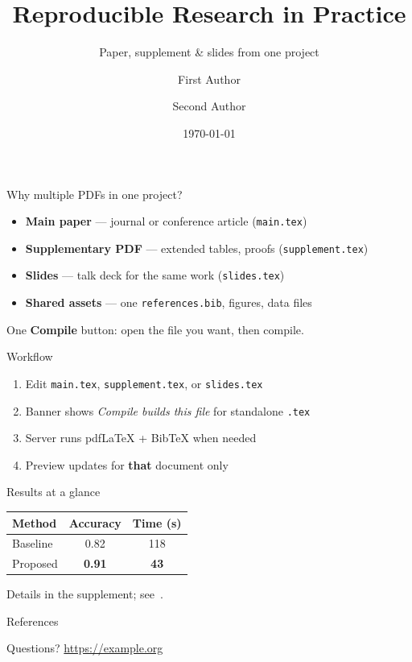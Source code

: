 \documentclass[11pt,aspectratio=169]{beamer}
\title[Multi-file \LaTeX]{Reproducible Research in Practice}
\subtitle{Paper, supplement \& slides from one project}
\author{First Author \and Second Author}
\institute{University of Example}
\date{\today}
\begin{document}
\begin{frame}
  \titlepage
\end{frame}

\begin{frame}{Why multiple PDFs in one project?}
  \begin{itemize}
    \item \textbf{Main paper} — journal or conference article (\texttt{main.tex})
    \item \textbf{Supplementary PDF} — extended tables, proofs (\texttt{supplement.tex})
    \item \textbf{Slides} — talk deck for the same work (\texttt{slides.tex})
    \item \textbf{Shared assets} — one \texttt{references.bib}, figures, data files
  \end{itemize}
  \vfill
  \small One \textbf{Compile} button: open the file you want, then compile.
\end{frame}

\begin{frame}{Workflow}
  \begin{enumerate}
    \item Edit \texttt{main.tex}, \texttt{supplement.tex}, or \texttt{slides.tex}
    \item Banner shows \emph{Compile builds this file} for standalone \texttt{.tex}
    \item Server runs pdfLaTeX + BibTeX when needed
    \item Preview updates for \textbf{that} document only
  \end{enumerate}
\end{frame}

\begin{frame}{Results at a glance}
  \begin{table}
    \centering
    \begin{tabular}{lcc}
      \toprule
      Method & Accuracy & Time (s) \\
      \midrule
      Baseline & 0.82 & 118 \\
      Proposed & \textbf{0.91} & \textbf{43} \\
      \bottomrule
    \end{tabular}
  \end{table}
  \vfill
  \footnotesize Details in the supplement; see~\cite{example2024methods}.
\end{frame}

\begin{frame}{References}
  \footnotesize
  
  
\end{frame}

\begin{frame}
  \centering
  \Large Questions?
  \vfill
  \small \url{https://example.org}
\end{frame}
\end{document}
